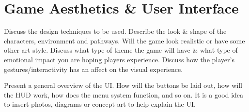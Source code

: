 \documentclass[a4paper, 12pt]{report}
\begin{document}
\section{Game Aesthetics \& User Interface}
Discuss the design techniques to be used. Describe the look \& shape of the characters, environment and pathways. Will the game look realistic or have some other art style. Discuss what type of theme the game will have \& what type of emotional impact you are hoping players experience. Discuss how the player’s gestures/interactivity has an affect on the visual experience. 

Present a general overview of the UI. How will the buttons be laid out, how will the HUD work, how does the menu system function, and so on. It is a good idea to insert photos, diagrams or concept art to help explain the UI.
\end{document}

